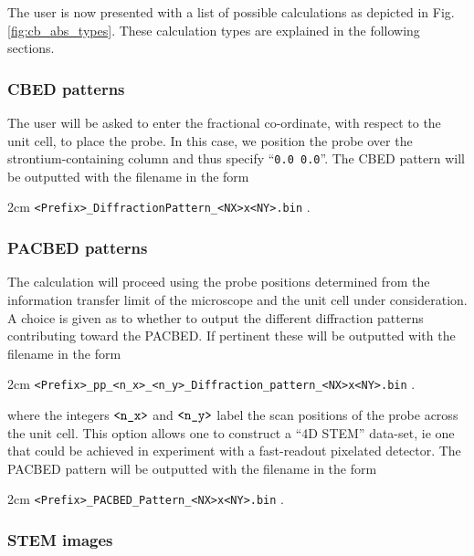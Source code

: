 \documentclass[12pt,a4paper]{article}
\newenvironment{myenv}{\begin{samepage}\begin{adjustwidth}{2cm}{}}{\end{adjustwidth}\end{samepage}}
\begin{document}
The user is now presented with a list of possible calculations as depicted in Fig. \ref{fig:cb_abs_types}.
These calculation types are explained in the following sections.



\subsubsection{CBED patterns}

The user will be asked to enter the fractional co-ordinate, with respect to the unit cell, to place the probe.
In this case, we position the probe over the strontium-containing column and thus specify ``\verb|0.0 0.0|''.
The CBED pattern will be outputted with the filename in the form
%
\begin{myenv}
    \verb|<Prefix>_DiffractionPattern_<NX>x<NY>.bin| \; .
\end{myenv}
%



\subsubsection{PACBED patterns} 

The calculation will proceed using the probe positions determined from the information transfer limit of the microscope and the unit cell under consideration.
A choice is given as to whether to output the different diffraction patterns contributing toward the PACBED.
If pertinent these will be outputted with the filename in the form
%
\begin{myenv}
	\verb|<Prefix>_pp_<n_x>_<n_y>_Diffraction_pattern_<NX>x<NY>.bin| \; .
\end{myenv}
where the integers $\verb|<n_x>|$ and $\verb|<n_y>|$ label the scan positions of the probe across the unit cell.
This option allows one to construct a ``4D STEM'' data-set, ie one that could be achieved in experiment with a fast-readout pixelated detector.
The PACBED pattern will be outputted with the filename in the form
%
\begin{myenv}
    \verb|<Prefix>_PACBED_Pattern_<NX>x<NY>.bin| \; .
\end{myenv}



\subsubsection{STEM images}
\end{document}
